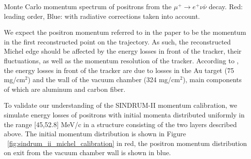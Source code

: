 {
  \label{fig:mu2e_5645_fig_001_mue3_decay}
  Monte Carlo momentum spectrum of positrons from the $\mu^+ \rightarrow e^+ \nu \bar{\nu}$
  decay. Red: leading order, Blue: with radiative corrections taken into account.
}
\vspace{0.1in}

We expect the positron momentum referred to in the paper
to be the momentum in the first reconstructed point on the trajectory. As such, the
reconstructed Michel edge should be affected by the energy losses in front of the
tracker, their fluctuations, as well as the momentum resolution of the tracker.
According to \cite{sindrum_ii:Bertl2006}, the energy losses in front of the tracker are due to 
losses in the Au target (75 mg/cm$^2$) and the wall of the vacuum chamber (324 mg/cm$^2$),
main components of which are aluminum and carbon fiber.

To validate our understanding of the SINDRUM-II momentum calibration,
we simulate energy losses of positrons with initial momenta distributed uniformly
in the range [45,52.8] MeV/c in a structure consisting of the two layers described
above. The initial momentum distribution is shown
in Figure ~\ref{fig:sindrum_ii_michel_calibration} in red,
the positron momentum distribution on exit from the vacuum chamber wall is shown in blue.

